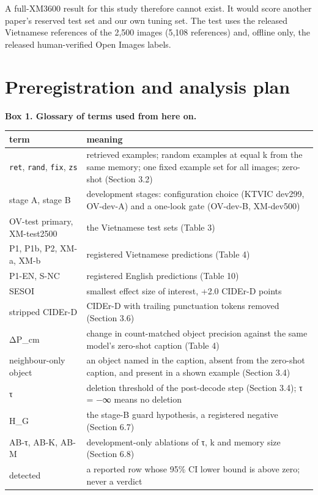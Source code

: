 \documentclass[manuscript,screen]{acmart}
\begin{document}
A full-XM3600 result for this study therefore cannot exist. It would score another paper's reserved
test set and our own tuning set. The test uses the released Vietnamese references of the 2,500
images (5,108 references) and, offline only, the released human-verified Open Images labels.

\section{Preregistration and analysis plan}\label{preregistration-and-analysis-plan}

\textbf{Box 1. Glossary of terms used from here on.}

\begin{longtable}[]{@{}
  >{\raggedright\arraybackslash}p{}
  >{\raggedright\arraybackslash}p{}@{}}
\toprule\noalign{}
\begin{minipage}[b]{\linewidth}\raggedright
term
\end{minipage} & \begin{minipage}[b]{\linewidth}\raggedright
meaning
\end{minipage} \\
\midrule\noalign{}
\endhead
\bottomrule\noalign{}
\endlastfoot
\texttt{ret}, \texttt{rand}, \texttt{fix}, \texttt{zs} & retrieved examples; random examples at
equal k from the same memory; one fixed example set for all images; zero-shot (Section 3.2) \\
stage A, stage B & development stages: configuration choice (KTVIC dev299, OV-dev-A) and a one-look
gate (OV-dev-B, XM-dev500) \\
OV-test primary, XM-test2500 & the Vietnamese test sets (Table 3) \\
P1, P1b, P2, XM-a, XM-b & registered Vietnamese predictions (Table 4) \\
P1-EN, S-NC & registered English predictions (Table 10) \\
SESOI & smallest effect size of interest, +2.0 CIDEr-D points \\
stripped CIDEr-D & CIDEr-D with trailing punctuation tokens removed (Section 3.6) \\
ΔP\_cm & change in count-matched object precision against the same model's zero-shot caption (Table
4) \\
neighbour-only object & an object named in the caption, absent from the zero-shot caption, and
present in a shown example (Section 3.4) \\
τ & deletion threshold of the post-decode step (Section 3.4); τ = −∞ means no deletion \\
H\_G & the stage-B guard hypothesis, a registered negative (Section 6.7) \\
AB-τ, AB-K, AB-M & development-only ablations of τ, k and memory size (Section 6.8) \\
detected & a reported row whose 95\% CI lower bound is above zero; never a verdict \\
\end{longtable}
\end{document}
